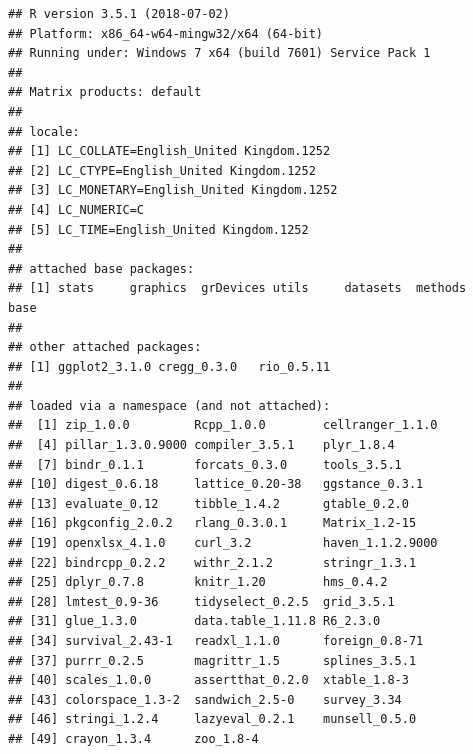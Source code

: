 \documentclass[a4paper,12pt]{article}\usepackage[]{graphicx}\usepackage[]{color}
\makeatletter
\newenvironment{kframe}{%
 \def\at@end@of@kframe{}%
 \ifinner\ifhmode%
  \def\at@end@of@kframe{\end{minipage}}%
  \begin{minipage}{\columnwidth}%
 \fi\fi%
 \def\FrameCommand##1{\hskip\@totalleftmargin \hskip-\fboxsep
 \colorbox{shadecolor}{##1}\hskip-\fboxsep
     \hskip-\linewidth \hskip-\@totalleftmargin \hskip\columnwidth}%
 \MakeFramed {\advance\hsize-\width
   \@totalleftmargin\z@ \linewidth\hsize
   \@setminipage}}%
 {\par\unskip\endMakeFramed%
 \at@end@of@kframe}
\newenvironment{knitrout}{}{} %
\makeatother
\begin{document}
\begin{knitrout}
\color{fgcolor}\begin{kframe}
\begin{verbatim}
## R version 3.5.1 (2018-07-02)
## Platform: x86_64-w64-mingw32/x64 (64-bit)
## Running under: Windows 7 x64 (build 7601) Service Pack 1
## 
## Matrix products: default
## 
## locale:
## [1] LC_COLLATE=English_United Kingdom.1252 
## [2] LC_CTYPE=English_United Kingdom.1252   
## [3] LC_MONETARY=English_United Kingdom.1252
## [4] LC_NUMERIC=C                           
## [5] LC_TIME=English_United Kingdom.1252    
## 
## attached base packages:
## [1] stats     graphics  grDevices utils     datasets  methods   base     
## 
## other attached packages:
## [1] ggplot2_3.1.0 cregg_0.3.0   rio_0.5.11   
## 
## loaded via a namespace (and not attached):
##  [1] zip_1.0.0         Rcpp_1.0.0        cellranger_1.1.0 
##  [4] pillar_1.3.0.9000 compiler_3.5.1    plyr_1.8.4       
##  [7] bindr_0.1.1       forcats_0.3.0     tools_3.5.1      
## [10] digest_0.6.18     lattice_0.20-38   ggstance_0.3.1   
## [13] evaluate_0.12     tibble_1.4.2      gtable_0.2.0     
## [16] pkgconfig_2.0.2   rlang_0.3.0.1     Matrix_1.2-15    
## [19] openxlsx_4.1.0    curl_3.2          haven_1.1.2.9000 
## [22] bindrcpp_0.2.2    withr_2.1.2       stringr_1.3.1    
## [25] dplyr_0.7.8       knitr_1.20        hms_0.4.2        
## [28] lmtest_0.9-36     tidyselect_0.2.5  grid_3.5.1       
## [31] glue_1.3.0        data.table_1.11.8 R6_2.3.0         
## [34] survival_2.43-1   readxl_1.1.0      foreign_0.8-71   
## [37] purrr_0.2.5       magrittr_1.5      splines_3.5.1    
## [40] scales_1.0.0      assertthat_0.2.0  xtable_1.8-3     
## [43] colorspace_1.3-2  sandwich_2.5-0    survey_3.34      
## [46] stringi_1.2.4     lazyeval_0.2.1    munsell_0.5.0    
## [49] crayon_1.3.4      zoo_1.8-4
\end{verbatim}
\end{kframe}
\end{knitrout}
\end{document}
